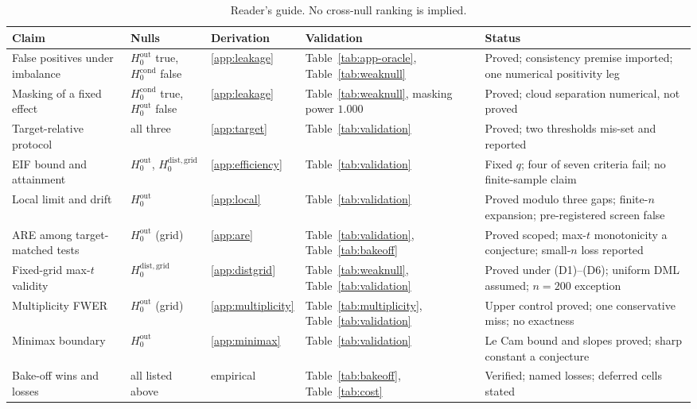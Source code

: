 \begin{table}[t]
\centering
\small
\setlength{\tabcolsep}{4pt}
\begin{tabularx}{\textwidth}{@{}>{\raggedright\arraybackslash}p{3.4cm}>{\raggedright\arraybackslash}p{2.4cm}>{\raggedright\arraybackslash}p{1.5cm}>{\raggedright\arraybackslash}p{3.2cm}>{\raggedright\arraybackslash}X@{}}
\hline
Claim & Nulls & Derivation & Validation & Status \\
\hline
False positives under imbalance & $H_0^{\mathrm{out}}$ true, $H_0^{\mathrm{cond}}$ false & \ref{app:leakage} & Table~\ref{tab:app-oracle}, Table~\ref{tab:weaknull} & Proved; consistency premise imported; one numerical positivity leg \\
Masking of a fixed effect & $H_0^{\mathrm{cond}}$ true, $H_0^{\mathrm{out}}$ false & \ref{app:leakage} & Table~\ref{tab:weaknull}, masking power $1.000$ & Proved; cloud separation numerical, not proved \\
Target-relative protocol & all three & \ref{app:target} & Table~\ref{tab:validation} & Proved; two thresholds mis-set and reported \\
EIF bound and attainment & $H_0^{\mathrm{out}}$, $H_0^{\mathrm{dist,grid}}$ & \ref{app:efficiency} & Table~\ref{tab:validation} & Fixed $q$; four of seven criteria fail; no finite-sample claim \\
Local limit and drift & $H_0^{\mathrm{out}}$ & \ref{app:local} & Table~\ref{tab:validation} & Proved modulo three gaps; finite-$n$ expansion; pre-registered screen false \\
ARE among target-matched tests & $H_0^{\mathrm{out}}$ (grid) & \ref{app:are} & Table~\ref{tab:validation}, Table~\ref{tab:bakeoff} & Proved scoped; max-$t$ monotonicity a conjecture; small-$n$ loss reported \\
Fixed-grid max-$t$ validity & $H_0^{\mathrm{dist,grid}}$ & \ref{app:distgrid} & Table~\ref{tab:weaknull}, Table~\ref{tab:validation} & Proved under (D1)--(D6); uniform DML assumed; $n=200$ exception \\
Multiplicity FWER & $H_0^{\mathrm{out}}$ (grid) & \ref{app:multiplicity} & Table~\ref{tab:multiplicity}, Table~\ref{tab:validation} & Upper control proved; one conservative miss; no exactness \\
Minimax boundary & $H_0^{\mathrm{out}}$ & \ref{app:minimax} & Table~\ref{tab:validation} & Le Cam bound and slopes proved; sharp constant a conjecture \\
Bake-off wins and losses & all listed above & empirical & Table~\ref{tab:bakeoff}, Table~\ref{tab:cost} & Verified; named losses; deferred cells stated \\
\hline
\end{tabularx}
\caption{Reader's guide. No cross-null ranking is implied.}
\label{tab:guide}
\end{table}

